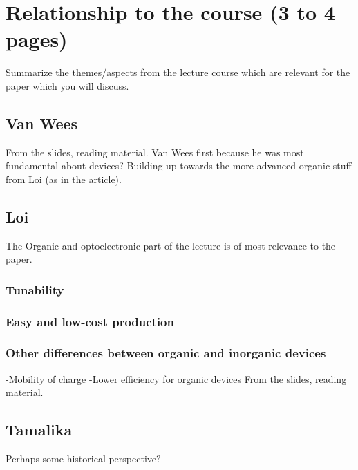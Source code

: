 \section{Relationship to the course (3 to 4 pages)}
Summarize the themes/aspects from the lecture course which are relevant for the paper which you will discuss. 



\subsection{Van Wees}
From the slides, reading material. Van Wees first because he was most fundamental about devices? Building up towards the more advanced organic stuff from Loi (as in the article).



\subsection{Loi}
The Organic and optoelectronic part of the lecture is of most relevance to the paper. 

\subsubsection{Tunability}
\subsubsection{Easy and low-cost production}
\subsubsection{Other differences between organic and inorganic devices}
-Mobility of charge
-Lower efficiency for organic devices
From the slides, reading material.



\subsection{Tamalika}
Perhaps some historical perspective?
